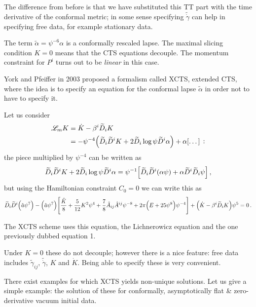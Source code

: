 \documentclass[main.tex]{subfiles}
\begin{document}
The difference from before is that we have substituted this TT part with the time derivative of the conformal metric; in some sense specifying \(\widetilde{\dot{\gamma}}\) can help in specifying free data, for example stationary data.

The term \(\widetilde{\alpha} = \psi^{-6} \alpha \) is a conformally rescaled lapse.
The maximal slicing condition \(K=0\) means that the CTS equations decouple.
The momentum constraint for \(P^{i}\) turns out to be \emph{linear} in this case. 

York and Pfeiffer in 2003 proposed a formalism called XCTS, extended CTS, where the idea is to specify an equation for the conformal lapse \(\widetilde{\alpha}\) in order not to have to specify it.

Let us consider 
%
\begin{align}
\mathscr{L}_m K &= \dot{K} - \beta^{i} \widetilde{D}_{i} K   \\
&= - \psi^{-4} \qty(\widetilde{D}_{i} \widetilde{D}^{i} K + 2 \widetilde{D}_{i} \log \psi \widetilde{D}^{i} \alpha ) 
+ \alpha \qty[ \dots]
\,:
\end{align}
%
the piece multiplied by \(\psi^{-4}\) can be written as 
%
\begin{align}
\widetilde{D}_{i} \widetilde{D}^{i} K + 2 \widetilde{D}_{i} \log \psi \widetilde{D}^{i} \alpha =
\psi^{-1} \qty[\widetilde{D}_{i} \widetilde{D}^{i} (\alpha \psi ) + \alpha \widetilde{D}^{i} \widetilde{D}_{i} \psi ]
\,,
\end{align}
%
but using the Hamiltonian constraint \(C_0 = 0\) we can write this as 
%
\begin{align}
\widetilde{D}_{i} \widetilde{D}^{i} \qty(\hat{a} \psi^{7})
- \qty(\hat{a} \psi^{7}) \qty[ \frac{\hat{K}}{8} 
+ \frac{5}{12} K^2 \psi^{4} + \frac{7}{8} \hat{A}_{ij} \hat{A}^{ij} 
\psi^{-8} + 2 \pi \qty( E + 25 \psi^{8}) \psi^{-4}]
+ \qty(\dot{K} - \beta^{i} \widetilde{D}_{i} K ) \psi^{5} = 0
\,.
\end{align}

The XCTS scheme uses this equation, the Lichnerowicz equation and the one previously dubbed equation 1. 

Under \(K = 0\) these do not decouple; however there is a nice feature: free data includes \(\widetilde{\gamma}_{ij} \), \(\widetilde{\dot{\gamma}}\), \(K\) and \(\dot{K}\). Being able to specify these is very convenient. 

There exist examples for which XCTS yields non-unique solutions. 
Let us give a simple example: the solution of these for conformally, asymptotically flat \& zero-derivative vacuum initial data. 
\end{document}
